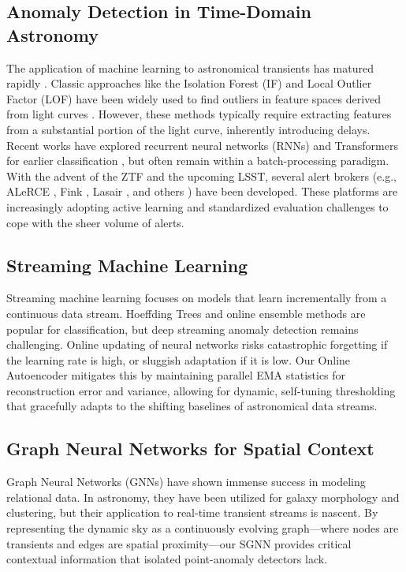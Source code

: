 \documentclass[10pt,journal,compsoc]{IEEEtran}
\begin{document}
\subsection{Anomaly Detection in Time-Domain Astronomy}
The application of machine learning to astronomical transients has matured rapidly \cite{villar2020supernova}. Classic approaches like the Isolation Forest (IF) \cite{liu2008isolation} and Local Outlier Factor (LOF) \cite{breunig2000lof} have been widely used to find outliers in feature spaces derived from light curves \cite{lochner2016photometric, boone2019avocado}. However, these methods typically require extracting features from a substantial portion of the light curve, inherently introducing delays. Recent works have explored recurrent neural networks (RNNs) and Transformers \cite{vaswani2017attention} for earlier classification \cite{muthukrishna2019rapid}, but often remain within a batch-processing paradigm.
With the advent of the ZTF and the upcoming LSST, several alert brokers (e.g., ALeRCE \cite{forster2021alerce}, Fink \cite{moller2021fink}, Lasair \cite{smith2019lasair}, and others \cite{soraisam2020novel}) have been developed. These platforms are increasingly adopting active learning \cite{ishida2019active} and standardized evaluation challenges \cite{malz2018plasticc} to cope with the sheer volume of alerts.

\subsection{Streaming Machine Learning}
Streaming machine learning focuses on models that learn incrementally from a continuous data stream. Hoeffding Trees and online ensemble methods are popular for classification, but deep streaming anomaly detection remains challenging. Online updating of neural networks risks catastrophic forgetting if the learning rate is high, or sluggish adaptation if it is low. Our Online Autoencoder mitigates this by maintaining parallel EMA statistics for reconstruction error and variance, allowing for dynamic, self-tuning thresholding that gracefully adapts to the shifting baselines of astronomical data streams.

\subsection{Graph Neural Networks for Spatial Context}
Graph Neural Networks (GNNs) have shown immense success in modeling relational data. In astronomy, they have been utilized for galaxy morphology and clustering, but their application to real-time transient streams is nascent. By representing the dynamic sky as a continuously evolving graph—where nodes are transients and edges are spatial proximity—our SGNN provides critical contextual information that isolated point-anomaly detectors lack.
\end{document}
